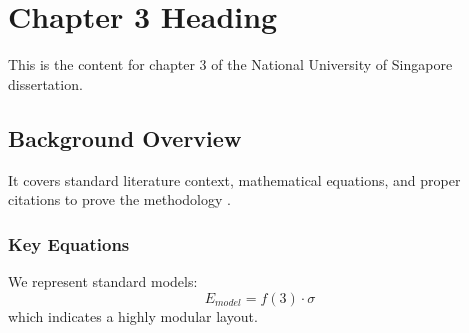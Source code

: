 \chapter{Chapter 3 Heading}
\label{ch:chapter3}
This is the content for chapter 3 of the National University of Singapore dissertation.

\section{Background Overview}
It covers standard literature context, mathematical equations, and proper citations to prove the methodology \cite{texbook}.

\subsection{Key Equations}
We represent standard models:
\begin{equation}
    E_{model} = f(3) \cdot \sigma
\end{equation}
which indicates a highly modular layout.
